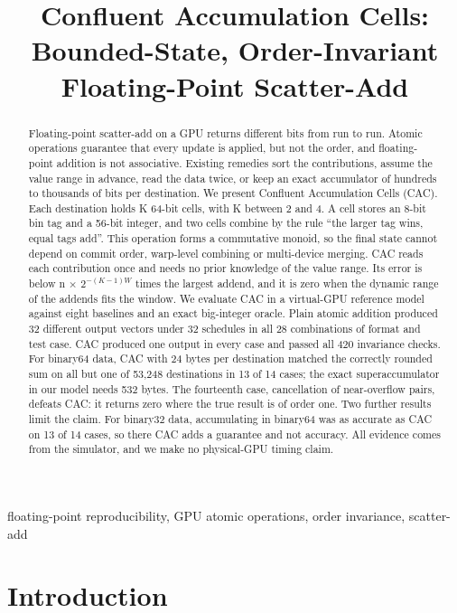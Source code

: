 \documentclass[journal]{IEEEtran}
\begin{document}
\title{Confluent Accumulation Cells: Bounded-State, Order-Invariant Floating-Point Scatter-Add}
\author{
}
\maketitle
\begin{abstract}
Floating-point scatter-add on a GPU returns different bits from run to run. Atomic operations guarantee that every update is applied, but not the order, and floating-point addition is not associative. Existing remedies sort the contributions, assume the value range in advance, read the data twice, or keep an exact accumulator of hundreds to thousands of bits per destination. We present Confluent Accumulation Cells (CAC). Each destination holds K 64-bit cells, with K between 2 and 4. A cell stores an 8-bit bin tag and a 56-bit integer, and two cells combine by the rule ``the larger tag wins, equal tags add''. This operation forms a commutative monoid, so the final state cannot depend on commit order, warp-level combining or multi-device merging. CAC reads each contribution once and needs no prior knowledge of the value range. Its error is below n × \(2^{-(K-1)W}\) times the largest addend, and it is zero when the dynamic range of the addends fits the window. We evaluate CAC in a virtual-GPU reference model against eight baselines and an exact big-integer oracle. Plain atomic addition produced 32 different output vectors under 32 schedules in all 28 combinations of format and test case. CAC produced one output in every case and passed all 420 invariance checks. For binary64 data, CAC with 24 bytes per destination matched the correctly rounded sum on all but one of 53,248 destinations in 13 of 14 cases; the exact superaccumulator in our model needs 532 bytes. The fourteenth case, cancellation of near-overflow pairs, defeats CAC: it returns zero where the true result is of order one. Two further results limit the claim. For binary32 data, accumulating in binary64 was as accurate as CAC on 13 of 14 cases, so there CAC adds a guarantee and not accuracy. All evidence comes from the simulator, and we make no physical-GPU timing claim.
\end{abstract}
\begin{IEEEkeywords}
floating-point reproducibility, GPU atomic operations, order invariance, scatter-add
\end{IEEEkeywords}
\hypertarget{introduction}{%
\section{Introduction}\label{introduction}}
\end{document}
